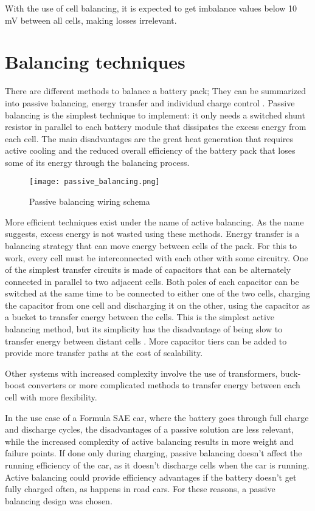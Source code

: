 With the use of cell balancing, it is expected to get imbalance values below 10 mV between all cells, making losses irrelevant.

\section{Balancing techniques}
There are different methods to balance a battery pack; They can be summarized into passive balancing, energy transfer and individual charge control \cite{6966514}.
Passive balancing is the simplest technique to implement: it only needs a switched shunt resistor in parallel to each battery module that dissipates the excess energy from each cell. The main disadvantages are the great heat generation that requires active cooling and the reduced overall efficiency of the battery pack that loses some of its energy through the balancing process.
\begin{figure}[h]
    \centering
    \texttt{[image: passive\_balancing.png]}
    \caption{Passive balancing wiring schema}
    \label{fig:passive_balancing}
\end{figure}

More efficient techniques exist under the name of active balancing. As the name suggests, excess energy is not wasted using these methods.
Energy transfer is a balancing strategy that can move energy between cells of the pack. For this to work, every cell must be interconnected with each other with some circuitry. One of the simplest transfer circuits is made of capacitors that can be alternately connected in parallel to two adjacent cells. Both poles of each capacitor can be switched at the same time to be connected to either one of the two cells, charging the capacitor from one cell and discharging it on the other, using the capacitor as a bucket to transfer energy between the cells. This is the simplest active balancing method, but its simplicity has the disadvantage of being slow to transfer energy between distant cells \cite{6966514}. More capacitor tiers can be added to provide more transfer paths at the cost of scalability.

Other systems with increased complexity involve the use of transformers, buck-boost converters or more complicated methods to transfer energy between each cell with more flexibility.

In the use case of a Formula SAE car, where the battery goes through full charge and discharge cycles, the disadvantages of a passive solution are less relevant, while the increased complexity of active balancing results in more weight and failure points. If done only during charging, passive balancing doesn't affect the running efficiency of the car, as it doesn't discharge cells when the car is running. Active balancing could provide efficiency advantages if the battery doesn't get fully charged often, as happens in road cars. For these reasons, a passive balancing design was chosen.

